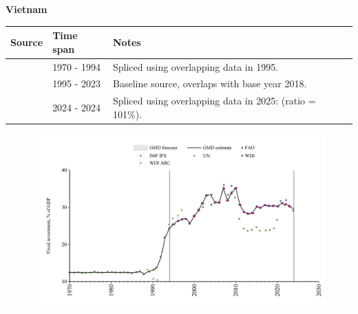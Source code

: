 \documentclass[12pt,a4paper,landscape]{article}
\begin{document}
\begin{adjustbox}{max totalsize={\paperwidth}{\paperheight},center}
\begin{minipage}[t][\textheight][t]{\textwidth}
\vspace*{0.5cm}
{}
\begin{center}
{\Large\bfseries Vietnam}
\end{center}
\vspace{0.5cm}
\begin{table}[H]
\centering
\small
\begin{tabular}{|l|l|l|}
\hline
\textbf{Source} & \textbf{Time span} & \textbf{Notes} \\
\hline
\rowcolor{white}\cite{UN}& 1970 - 1994 &Spliced using overlapping data in 1995.\\
\rowcolor{lightgray}\cite{WDI}& 1995 - 2023 &Baseline source, overlaps with base year 2018.\\
\rowcolor{white}\cite{IMF_IFS}& 2024 - 2024 &Spliced using overlapping data in 2025: (ratio = 101\%).\\
\hline
\end{tabular}
\end{table}
\begin{figure}[H]
\centering
\includegraphics[width=\textwidth,height=0.6\textheight,keepaspectratio]{graphs/VNM_finv_GDP.pdf}
\end{figure}
\end{minipage}
\end{adjustbox}
\end{document}
